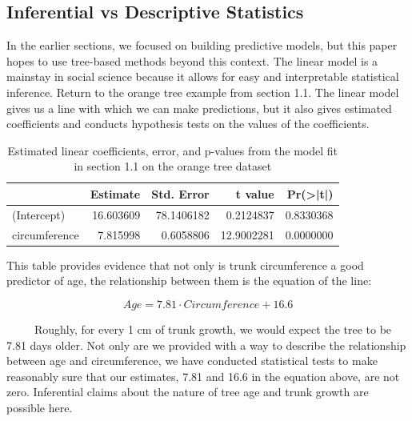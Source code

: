 \documentclass[12pt,twoside]{reedthesis}
\begin{document}
  \subsection{Inferential vs Descriptive
  Statistics}\label{inferential-vs-descriptive-statistics}
  
  In the earlier sections, we focused on building predictive models, but
  this paper hopes to use tree-based methods beyond this context. The
  linear model is a mainstay in social science because it allows for easy
  and interpretable statistical inference. Return to the orange tree
  example from section 1.1. The linear model gives us a line with which we
  can make predictions, but it also gives estimated coefficients and
  conducts hypothesis tests on the values of the coefficients.
  
  \begin{table}
  
  \caption{\label{tab:unnamed-chunk-11}\label{tab:tablmcoef}Estimated linear coefficients, error, and p-values from the model fit in section 1.1 on the orange tree dataset}
  \centering
  \begin{tabular}[t]{l|r|r|r|r}
  \hline
    & Estimate & Std. Error & t value & Pr(>|t|)\\
  \hline
  (Intercept) & 16.603609 & 78.1406182 & 0.2124837 & 0.8330368\\
  \hline
  circumference & 7.815998 & 0.6058806 & 12.9002281 & 0.0000000\\
  \hline
  \end{tabular}
  \end{table}
  
  This table provides evidence that not only is trunk circumference a good
  predictor of age, the relationship between them is the equation of the
  line:
  
  \[Age = 7.81 \cdot Circumference + 16.6\]
  
  ~~~~~Roughly, for every 1 cm of trunk growth, we would expect the tree
  to be 7.81 days older. Not only are we provided with a way to describe
  the relationship between age and circumference, we have conducted
  statistical tests to make reasonably sure that our estimates, 7.81 and
  16.6 in the equation above, are not zero. Inferential claims about the
  nature of tree age and trunk growth are possible here.
  
\end{document}
